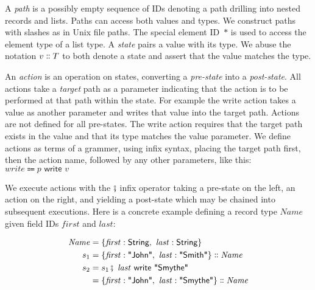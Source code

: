 \documentclass[english,submission]{programming}
\newcommand{\mathbox}[1]{\colorbox{black!10}{$#1$}}
\DeclareMathOperator{\exec}{\fatsemi\ }
\newcommand{\isa}{\dblcolon}
\newcommand{\quotedstring}[1]{\textsf{\textquotedbl{#1}\textquotedbl}}
\begin{document}
A \textit{path} is a possibly empty sequence of IDs denoting a path drilling into nested records and lists. Paths can access both values and types. We construct paths with slashes as in Unix file paths. The special element ID~\mathbox{*} is used to access the element type of a list type.
A \textit{state} pairs a value with its type. We abuse the notation \mathbox{v \isa T} to both denote a state and assert that the value matches the type.

An \textit{action} is an operation on states, converting a \textit{pre-state} into a \textit{post-state}.
All actions take a \textit{target} path as a parameter indicating that the action is to be performed at that path within the state.
For example the \textsf{write} action takes a value as another parameter and writes that value into the target path. Actions are not defined for all pre-states. The \textsf{write} action requires that the target path exists in the value and that its type matches the value parameter. We define actions as terms of a grammer,
using infix syntax, placing the target path first, then the action name, followed by any other parameters, like this:
\mathbox{\mathit{write} \Coloneqq p \textsf{ write } v}

We execute actions with the \mathbox{\fatsemi} infix operator taking a pre-state on the left, an action on the right, and yielding a post-state which may be chained into subsequent executions. Here is a concrete example defining a record type \mathbox{\mathit{Name}} given field IDs \mathbox{\mathit{first}} and \mathbox{\mathit{last}}:

\begin{align*}
\mathit{Name} &= \{\mathit{first}  : \textsf{String},\  \mathit{last} : \textsf{String}\}\\
s_1 &= \{\mathit{first}: \quotedstring{John},\  \mathit{last}: \quotedstring{Smith}\} \isa \mathit{Name}\\
s_2 &= s_1 \exec \mathit{last} \textsf{ write } \quotedstring{Smythe}\\
&= \{\mathit{first}: \quotedstring{John},\  \mathit{last}: \quotedstring{Smythe}\} \isa \mathit{Name}\\
\end{align*}
\end{document}
